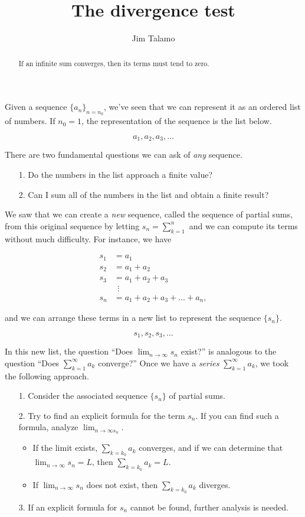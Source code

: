 \documentclass{ximera}
\author{Jim Talamo}
\title[Dig-In:]{The divergence test}
\begin{document}
\begin{abstract}
If an infinite sum converges, then its terms must tend to zero.
\end{abstract}
\maketitle

Given a sequence $\{a_n\}_{n=n_0}$, we've seen that we can represent it as an ordered list of numbers.  If $n_0=1$, the representation of the sequence is the list below.

\[
a_1, a_2, a_3, \ldots
\]

There are two fundamental questions we can ask of \emph{any} sequence.

\begin{itemize}
\item[1.] Do the numbers in the list approach a finite value?
\item[2.] Can I sum all of the numbers in the list and obtain a finite result?
\end{itemize}

We saw that we can create a \emph{new} sequence, called the sequence of partial sums, from this original sequence by letting $s_n = \sum_{k=1}^n$ and we can compute its terms without much difficulty.  For instance, we have

\begin{align*}
s_1 &= a_1\\
s_2&=a_1+a_2\\
s_3&=a_1+a_2+a_3\\
& ~ ~ \vdots \\
s_n &= a_1+a_2+a_3 +\ldots + a_n,
\end{align*}

and we can arrange these terms in a new list to represent the sequence $\{s_n\}$.

\[
s_1, s_2, s_3, \ldots
\]

In this new list, the question ``Does $\lim_{n \to \infty} s_n$ exist?'' is analogous to the question ``Does $\sum_{k=1}^{\infty} a_k$ converge?''  Once we have a \emph{series} $\sum_{k=1}^{\infty} a_k$, we  took the following approach.

\begin{itemize}
\item[1.] Consider the associated sequence $\{s_n\}$ of partial sums.
\item[2.] Try to find an explicit formula for the term $s_n$.  If you can find such a formula, analyze $\lim_{n \to \infty s_n}$.  
\begin{itemize}
\item If the limit exists, $\sum_{k=k_0} a_k$ converges, and if we can determine that $\lim_{n \to \infty} s_n =L$, then $\sum_{k=k_0} a_k=L$.  \item If  $\lim_{n \to \infty} s_n$ does not exist, then $\sum_{k=k_0} a_k$ diverges.
\end{itemize}
\item[3.] If an explicit formula for $s_n$ cannot be found, further analysis is needed.  
\end{itemize}
\end{document}
